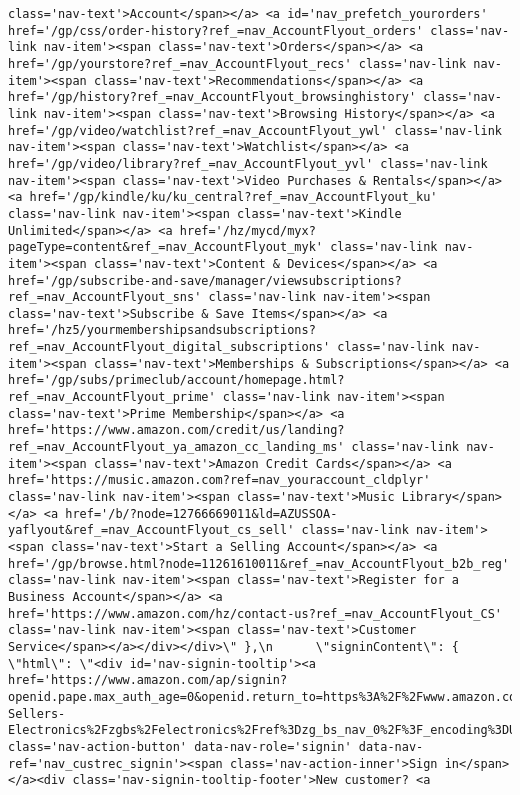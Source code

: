 \documentclass[
]{article}
\begin{document}
\begin{verbatim}
class='nav-text'>Account</span></a> <a id='nav_prefetch_yourorders' href='/gp/css/order-history?ref_=nav_AccountFlyout_orders' class='nav-link nav-item'><span class='nav-text'>Orders</span></a> <a href='/gp/yourstore?ref_=nav_AccountFlyout_recs' class='nav-link nav-item'><span class='nav-text'>Recommendations</span></a> <a href='/gp/history?ref_=nav_AccountFlyout_browsinghistory' class='nav-link nav-item'><span class='nav-text'>Browsing History</span></a> <a href='/gp/video/watchlist?ref_=nav_AccountFlyout_ywl' class='nav-link nav-item'><span class='nav-text'>Watchlist</span></a> <a href='/gp/video/library?ref_=nav_AccountFlyout_yvl' class='nav-link nav-item'><span class='nav-text'>Video Purchases & Rentals</span></a> <a href='/gp/kindle/ku/ku_central?ref_=nav_AccountFlyout_ku' class='nav-link nav-item'><span class='nav-text'>Kindle Unlimited</span></a> <a href='/hz/mycd/myx?pageType=content&ref_=nav_AccountFlyout_myk' class='nav-link nav-item'><span class='nav-text'>Content & Devices</span></a> <a href='/gp/subscribe-and-save/manager/viewsubscriptions?ref_=nav_AccountFlyout_sns' class='nav-link nav-item'><span class='nav-text'>Subscribe & Save Items</span></a> <a href='/hz5/yourmembershipsandsubscriptions?ref_=nav_AccountFlyout_digital_subscriptions' class='nav-link nav-item'><span class='nav-text'>Memberships & Subscriptions</span></a> <a href='/gp/subs/primeclub/account/homepage.html?ref_=nav_AccountFlyout_prime' class='nav-link nav-item'><span class='nav-text'>Prime Membership</span></a> <a href='https://www.amazon.com/credit/us/landing?ref_=nav_AccountFlyout_ya_amazon_cc_landing_ms' class='nav-link nav-item'><span class='nav-text'>Amazon Credit Cards</span></a> <a href='https://music.amazon.com?ref=nav_youraccount_cldplyr' class='nav-link nav-item'><span class='nav-text'>Music Library</span></a> <a href='/b/?node=12766669011&ld=AZUSSOA-yaflyout&ref_=nav_AccountFlyout_cs_sell' class='nav-link nav-item'><span class='nav-text'>Start a Selling Account</span></a> <a href='/gp/browse.html?node=11261610011&ref_=nav_AccountFlyout_b2b_reg' class='nav-link nav-item'><span class='nav-text'>Register for a Business Account</span></a> <a href='https://www.amazon.com/hz/contact-us?ref_=nav_AccountFlyout_CS' class='nav-link nav-item'><span class='nav-text'>Customer Service</span></a></div></div>\" },\n      \"signinContent\": { \"html\": \"<div id='nav-signin-tooltip'><a href='https://www.amazon.com/ap/signin?openid.pape.max_auth_age=0&openid.return_to=https%3A%2F%2Fwww.amazon.com%2FBest-Sellers-Electronics%2Fzgbs%2Felectronics%2Fref%3Dzg_bs_nav_0%2F%3F_encoding%3DUTF8%26ref_%3Dnav_custrec_signin&openid.identity=http%3A%2F%2Fspecs.openid.net%2Fauth%2F2.0%2Fidentifier_select&openid.assoc_handle=usflex&openid.mode=checkid_setup&openid.claimed_id=http%3A%2F%2Fspecs.openid.net%2Fauth%2F2.0%2Fidentifier_select&openid.ns=http%3A%2F%2Fspecs.openid.net%2Fauth%2F2.0&' class='nav-action-button' data-nav-role='signin' data-nav-ref='nav_custrec_signin'><span class='nav-action-inner'>Sign in</span></a><div class='nav-signin-tooltip-footer'>New customer? <a 
\end{verbatim}
\end{document}
